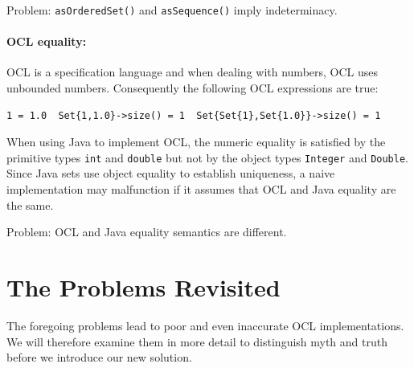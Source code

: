 \documentclass{llncs}
\begin{document}
Problem: \verb$asOrderedSet()$ and \verb$asSequence()$ imply indeterminacy.

\paragraph{OCL equality:}

OCL is a specification language and when dealing with numbers, OCL uses unbounded numbers. Consequently the following OCL expressions are true:
\begin{verbatim}
1 = 1.0  Set{1,1.0}->size() = 1  Set{Set{1},Set{1.0}}->size() = 1
\end{verbatim}
When using Java to implement OCL, the numeric equality is satisfied by the primitive types \verb$int$ and \verb$double$ but not by the object types \verb$Integer$ and \verb$Double$. Since Java sets use object equality to establish uniqueness, a naive implementation may malfunction if it assumes that OCL and Java equality are the same.

Problem: OCL and Java equality semantics are different.


\section{The Problems Revisited}\label{Problems Revisited}

The foregoing problems lead to poor and even inaccurate OCL implementations. We will therefore examine them in more detail to distinguish myth and truth before we introduce our new solution.


\end{document}
